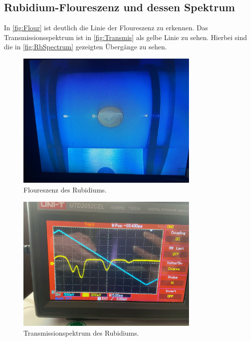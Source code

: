 \subsection{Rubidium-Floureszenz und dessen Spektrum}
\label{sec:Ausw2}
In \autoref{fig:Flour} ist deutlich die Linie der Floureszenz zu erkennen. Das Transmissionsspektrum ist in \autoref{fig:Transmis} als gelbe Linie zu sehen. Hierbei sind die in \autoref{fig:RbSpectrum} gezeigten Übergänge zu sehen.

\begin{figure}
    \centering
        \includegraphics[width=0.8\textwidth]{Luminiszenz.jpeg}
        \caption{Floureszenz des Rubidiums.}
        \label{fig:Flour} 
\end{figure}

\begin{figure}
    \centering
        \includegraphics[width=0.8\textwidth]{Spectrum.jpeg}
        \caption{Transmissionspektrum des Rubidiums.}
        \label{fig:Transmis} 
\end{figure}